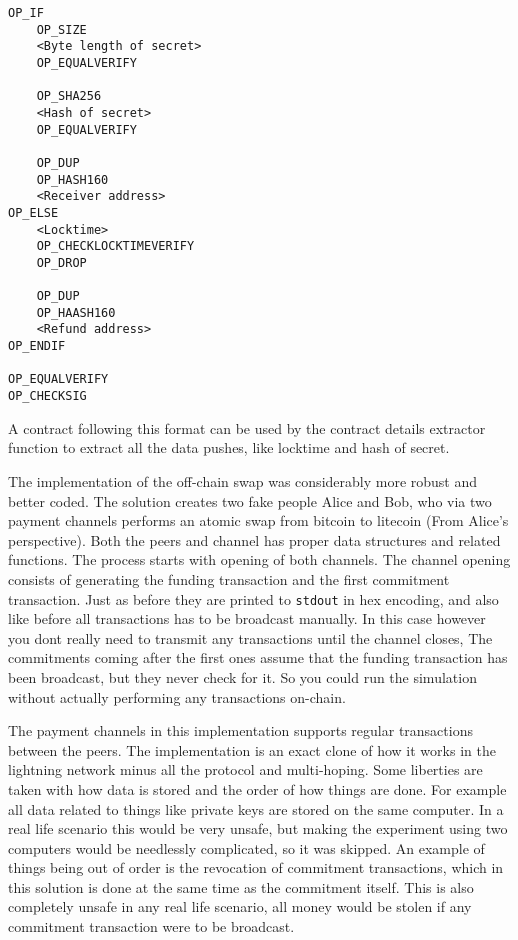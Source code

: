 \begin{verbatim}
OP_IF
    OP_SIZE
    <Byte length of secret>
    OP_EQUALVERIFY
    
    OP_SHA256
    <Hash of secret>
    OP_EQUALVERIFY
    
    OP_DUP
    OP_HASH160
    <Receiver address>
OP_ELSE
    <Locktime>
    OP_CHECKLOCKTIMEVERIFY
    OP_DROP
    
    OP_DUP
    OP_HAASH160
    <Refund address>
OP_ENDIF

OP_EQUALVERIFY
OP_CHECKSIG
\end{verbatim}

A contract following this format can be used by the contract details 
extractor function to extract all the data pushes, like locktime and 
hash of secret.

The implementation of the off-chain swap was considerably more robust and better coded.
The solution creates two fake people Alice and Bob, who via two payment channels performs
an atomic swap from bitcoin to litecoin (From Alice's perspective). Both the peers and
channel has proper data structures  and related functions. The process starts with 
opening of both channels. The channel opening consists of generating the funding transaction 
and the first commitment transaction. Just as before they are printed to \texttt{stdout} 
in hex encoding, and also like before all transactions has to be broadcast manually. In
this case however you dont really need to transmit any transactions until the channel closes,
The commitments coming after the first ones assume that the funding transaction has been broadcast,
but they never check for it. So you could run the simulation without actually performing any transactions
on-chain.

The payment channels in this implementation supports regular transactions between the peers. The implementation
is an exact clone of how it works in the lightning network minus all the protocol and multi-hoping.
Some liberties are taken with how data is stored and the order of how things are done. For example 
all data related to things like private keys are stored on the same computer. In a real life scenario this
would be very unsafe, but making the experiment using two computers would be needlessly complicated, so
it was skipped. An example of things being out of order is the revocation of commitment transactions, which 
in this solution is done at the same time as the commitment itself. This is also completely unsafe 
in any real life scenario, all money would be stolen if any commitment transaction were to be broadcast. 

